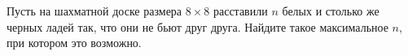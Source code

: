 
Пусть на шахматной доске размера $8 \times 8$  расставили $n$ белых и столько же черных ладей так, что они не бьют друг друга. Найдите такое максимальное $n$, при котором это возможно.

\soultionSection

